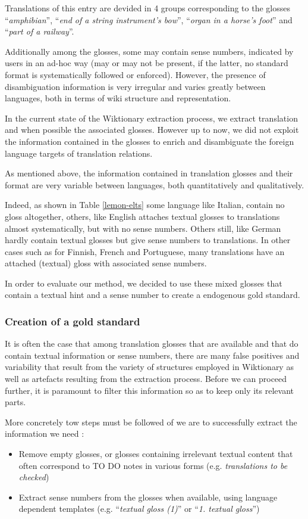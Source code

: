 \documentclass[10pt, a4paper]{article}
\begin{document}
Translations of this entry are devided in 4 groups corresponding to the glosses ``\emph{amphibian}'', ``\emph{end of a string instrument’s bow}'', ``\emph{organ in a horse’s foot}'' and ``\emph{part of a railway}''. 

Additionally among the glosses, some may contain sense numbers, indicated by users in an ad-hoc way (may or may not be present, if the latter, no standard format is systematically followed or enforced). However, the presence of disambiguation information is very irregular and varies greatly between languages, both in terms of wiki structure and representation.

In the current state of the Wiktionary extraction process, we extract translation and when possible the associated glosses. However up to now, we did not exploit the information contained in the glosses to enrich and disambiguate the foreign language targets of translation relations.

As mentioned above, the information contained in translation glosses and their format are very variable between languages, both quantitatively and qualitatively. 

Indeed, as shown in Table \ref{lemon-elts} some language like Italian, contain no gloss altogether, others, like English attaches textual glosses to translations almost systematically, but with no sense numbers. Others still, like German hardly contain textual glosses but give sense numbers to translations. In other cases such as for Finnish, French and Portuguese, many translations have an attached (textual) gloss with associated sense numbers. 

In order to evaluate our method, we decided to use these mixed glosses that contain a textual hint and a sense number to create a endogenous gold standard.

\subsubsection{Creation of a gold standard}

It is often the case that among translation glosses that are available and that do contain textual information or sense numbers, there are many false positives and variability that result from the variety of structures employed in Wiktionary as well as artefacts resulting from the extraction process. Before we can proceed further, it is paramount to filter this information so as to keep only its relevant parts. 

More concretely tow steps must be followed of we are to successfully extract the information we need :
\begin{itemize}
   \item Remove empty glosses, or glosses containing irrelevant textual content that often correspond to TO DO notes in various forms (e.g. \emph{translations to be checked})
   \item Extract sense numbers from the glosses when available, using language dependent templates (e.g. ``\emph{textual gloss (1)}'' or ``\emph{1. textual gloss}'') 
\end{itemize}
\end{document}

